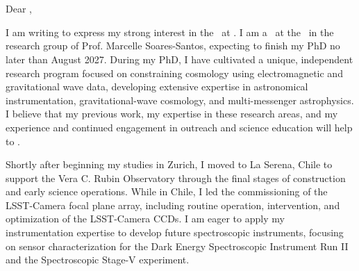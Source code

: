 \documentclass[10pt]{article}
\begin{document}
\begin{flushright}
\textbf{\ApplicantName}\\ 
\ApplicantInstitutionNameOne\\
\ApplicantInstitutionNameTwo\\
\ApplicantInstitutionAddressLine\\ \ApplicantInstitutionCityLine\\
\end{flushright}

\RecipientNameOne \hfill \LetterDate \\
\RecipientInstitution \\

Dear \RecipientNameTwo,

\vspace{0.25em}

I am writing to express my strong interest in the \PositionTitle\ at \RecipientInstitution. 
I am a \ApplicantTitle\ at the \ApplicantInstitutionNameTwo\ in the research group of Prof. Marcelle Soares-Santos, expecting to finish my PhD no later than August 2027.
During my PhD, I have cultivated a unique, independent research program focused on constraining cosmology using electromagnetic and gravitational wave data, developing extensive expertise in astronomical instrumentation, gravitational-wave cosmology, and multi-messenger astrophysics. I believe that my previous work, my expertise in these research areas, and my experience and continued engagement in outreach and science education will help to \HostGroupDescriptor.

Shortly after beginning my studies in Zurich, I moved to La Serena, Chile to support the Vera C. Rubin Observatory through the final stages of construction and early science operations.
While in Chile, I led the commissioning of the LSST-Camera focal plane array, including routine operation, intervention, and optimization of the LSST-Camera CCDs. 
\textcolor{\tcolor}{I am eager to apply my instrumentation expertise to develop future spectroscopic instruments, focusing on sensor characterization for the Dark Energy Spectroscopic Instrument Run II and the Spectroscopic Stage-V experiment.}
\end{document}
